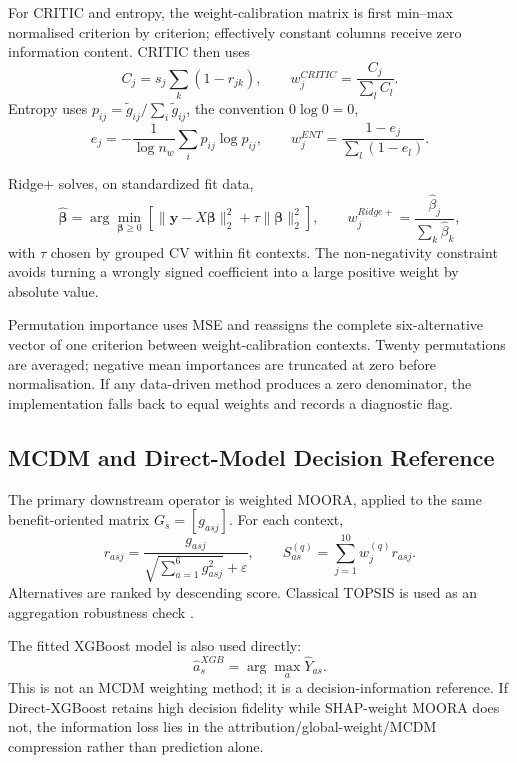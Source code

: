 \documentclass[runningheads]{llncs}
\newcommand{\eps}{\varepsilon}
\begin{document}
For CRITIC and entropy, the weight-calibration matrix is first min--max normalised criterion by
criterion; effectively constant columns receive zero information content. CRITIC then uses
\begin{equation}
C_j=s_j\sum_k(1-r_{jk}),
\qquad
w_j^{CRITIC}=\frac{C_j}{\sum_lC_l}.
\label{eq:critic}
\end{equation}
Entropy uses $p_{ij}=\tilde g_{ij}/\sum_i\tilde g_{ij}$, the convention $0\log0=0$,
\begin{equation}
e_j=-\frac{1}{\log n_w}\sum_i p_{ij}\log p_{ij},
\qquad
w_j^{ENT}=\frac{1-e_j}{\sum_l(1-e_l)}.
\label{eq:entropy}
\end{equation}

Ridge+ solves, on standardized fit data,
\begin{equation}
\hat{\boldsymbol\beta}
=
\arg\min_{\boldsymbol\beta\ge0}
\left[\|\mathbf y-X\boldsymbol\beta\|_2^2
+\tau\|\boldsymbol\beta\|_2^2\right],
\qquad
w_j^{Ridge+}=\frac{\hat\beta_j}{\sum_k\hat\beta_k},
\label{eq:ridgeplus}
\end{equation}
with $\tau$ chosen by grouped CV within fit contexts. The non-negativity constraint avoids
turning a wrongly signed coefficient into a large positive weight by absolute value.

Permutation importance uses MSE and reassigns the complete six-alternative vector of one
criterion between weight-calibration contexts. Twenty permutations are averaged; negative mean
importances are truncated at zero before normalisation. If any data-driven method produces a
zero denominator, the implementation falls back to equal weights and records a diagnostic flag.

\subsection{MCDM and Direct-Model Decision Reference}

The primary downstream operator is weighted MOORA, applied to the same benefit-oriented matrix
$G_s=[g_{asj}]$. For each context,
\begin{equation}
r_{asj}=\frac{g_{asj}}{\sqrt{\sum_{a=1}^{6}g_{asj}^2}+\eps},
\qquad
S_{as}^{(q)}=\sum_{j=1}^{10}w_j^{(q)}r_{asj}.
\label{eq:moora}
\end{equation}
Alternatives are ranked by descending score. Classical TOPSIS is used as an aggregation
robustness check \cite{brauers2006moora,hwang1981topsis}.

The fitted XGBoost model is also used directly:
\begin{equation}
\hat a_s^{XGB}=\arg\max_a\hat Y_{as}.
\label{eq:directxgb}
\end{equation}
This is not an MCDM weighting method; it is a decision-information reference. If Direct-XGBoost
retains high decision fidelity while SHAP-weight MOORA does not, the information loss lies in
the attribution/global-weight/MCDM compression rather than prediction alone.
\end{document}
